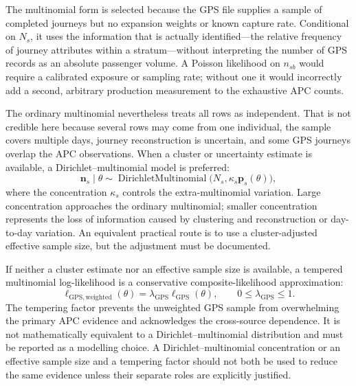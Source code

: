 The multinomial form is selected because the GPS file supplies a sample of
completed journeys but no expansion weights or known capture rate.  Conditional
on $N_s$, it uses the information that is actually identified---the relative
frequency of journey attributes within a stratum---without interpreting the
number of GPS records as an absolute passenger volume.  A Poisson likelihood on
$n_{sb}$ would require a calibrated exposure or sampling rate; without one it
would incorrectly add a second, arbitrary production measurement to the
exhaustive APC counts.

The ordinary multinomial nevertheless treats all rows as independent.  That is
not credible here because several rows may come from one individual, the sample
covers multiple days, journey reconstruction is uncertain, and some GPS
journeys overlap the APC observations.  When a cluster or uncertainty estimate
is available, a Dirichlet--multinomial model is preferred:
\begin{equation}
  \boldsymbol{n}_s\mid\theta
  \sim \operatorname{DirichletMultinomial}
       \bigl(N_s,\kappa_s\boldsymbol{p}_s(\theta)\bigr),
  \label{eq:gps-dirichlet-multinomial}
\end{equation}
where the concentration $\kappa_s$ controls the extra-multinomial variation.
Large concentration approaches the ordinary multinomial; smaller concentration
represents the loss of information caused by clustering and reconstruction or
day-to-day variation.  An equivalent practical route is to use a
cluster-adjusted effective sample size, but the adjustment must be documented.

If neither a cluster estimate nor an effective sample size is available, a
tempered multinomial log-likelihood is a conservative composite-likelihood
approximation:
\begin{equation}
  \ell_{\mathrm{GPS,weighted}}(\theta)
  =\lambda_{\mathrm{GPS}}\ell_{\mathrm{GPS}}(\theta),
  \qquad 0\leq\lambda_{\mathrm{GPS}}\leq 1.
  \label{eq:gps-tempered-likelihood}
\end{equation}
The tempering factor prevents the unweighted GPS sample from overwhelming the
primary APC evidence and acknowledges the cross-source dependence.  It is not
mathematically equivalent to a Dirichlet--multinomial distribution and must be
reported as a modelling choice.  A Dirichlet--multinomial concentration or an
effective sample size and a tempering factor should not both be used to reduce
the same evidence unless their separate roles are explicitly justified.

